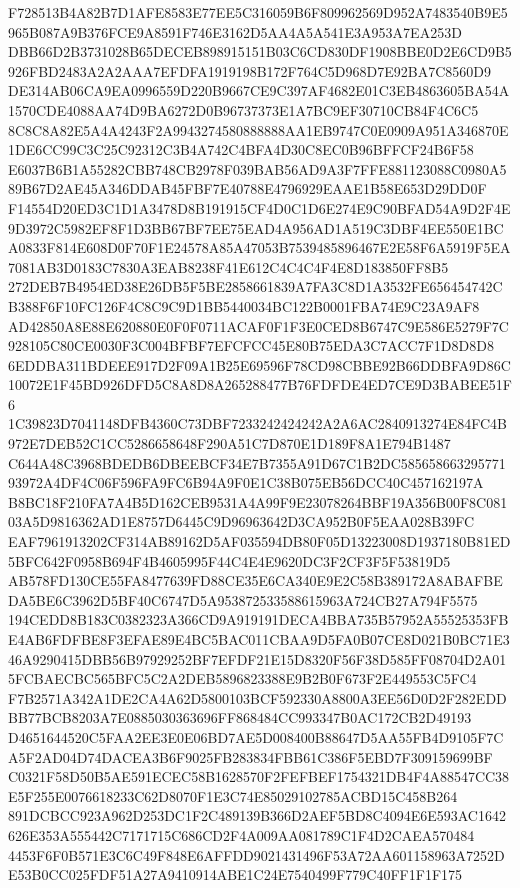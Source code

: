\documentclass[UTF8,fontset=fandol,zihao=-4,a4paper]{ctexart}
\begin{document}
{{F728513B4A82B7D1AFE8583E77EE5C316059B6F809962569D952A7483540B9E5965B087A9B376FCE9A8591F746E3162D5AA4A5A541E3A953A7EA253D
DBB66D2B3731028B65DECEB898915151B03C6CD830DF1908BBE0D2E6CD9B5926FBD2483A2A2AAA7EFDFA1919198B172F764C5D968D7E92BA7C8560D9
DE314AB06CA9EA0996559D220B9667CE9C397AF4682E01C3EB4863605BA54A1570CDE4088AA74D9BA6272D0B96737373E1A7BC9EF30710CB84F4C6C5
8C8C8A82E5A4A4243F2A9943274580888888AA1EB9747C0E0909A951A346870E1DE6CC99C3C25C92312C3B4A742C4BFA4D30C8EC0B96BFFCF24B6F58
E6037B6B1A55282CBB748CB2978F039BAB56AD9A3F7FFE881123088C0980A589B67D2AE45A346DDAB45FBF7E40788E4796929EAAE1B58E653D29DD0F
F14554D20ED3C1D1A3478D8B191915CF4D0C1D6E274E9C90BFAD54A9D2F4E9D3972C5982EF8F1D3BB67BF7EE75EAD4A956AD1A519C3DBF4EE550E1BC
A0833F814E608D0F70F1E24578A85A47053B7539485896467E2E58F6A5919F5EA7081AB3D0183C7830A3EAB8238F41E612C4C4C4F4E8D183850FF8B5
272DEB7B4954ED38E26DB5F5BE2858661839A7FA3C8D1A3532FE656454742CB388F6F10FC126F4C8C9C9D1BB5440034BC122B0001FBA74E9C23A9AF8
AD42850A8E88E620880E0F0F0711ACAF0F1F3E0CED8B6747C9E586E5279F7C928105C80CE0030F3C004BFBF7EFCFCC45E80B75EDA3C7ACC7F1D8D8D8
6EDDBA311BDEEE917D2F09A1B25E69596F78CD98CBBE92B66DDBFA9D86C10072E1F45BD926DFD5C8A8D8A265288477B76FDFDE4ED7CE9D3BABEE51F6
1C39823D7041148DFB4360C73DBF7233242424242A2A6AC2840913274E84FC4B972E7DEB52C1CC5286658648F290A51C7D870E1D189F8A1E794B1487
C644A48C3968BDEDB6DBEEBCF34E7B7355A91D67C1B2DC58565866329577193972A4DF4C06F596FA9FC6B94A9F0E1C38B075EB56DCC40C457162197A
B8BC18F210FA7A4B5D162CEB9531A4A99F9E23078264BBF19A356B00F8C08103A5D9816362AD1E8757D6445C9D96963642D3CA952B0F5EAA028B39FC
EAF7961913202CF314AB89162D5AF035594DB80F05D13223008D1937180B81ED5BFC642F0958B694F4B4605995F44C4E4E9620DC3F2CF3F5F53819D5
AB578FD130CE55FA8477639FD88CE35E6CA340E9E2C58B389172A8ABAFBEDA5BE6C3962D5BF40C6747D5A953872533588615963A724CB27A794F5575
194CEDD8B183C0382323A366CD9A919191DECA4BBA735B57952A55525353FBE4AB6FDFBE8F3EFAE89E4BC5BAC011CBAA9D5FA0B07CE8D021B0BC71E3
46A9290415DBB56B97929252BF7EFDF21E15D8320F56F38D585FF08704D2A015FCBAECBC565BFC5C2A2DEB5896823388E9B2B0F673F2E449553C5FC4
F7B2571A342A1DE2CA4A62D5800103BCF592330A8800A3EE56D0D2F282EDDBB77BCB8203A7E0885030363696FF868484CC993347B0AC172CB2D49193
D4651644520C5FAA2EE3E0E06BD7AE5D008400B88647D5AA55FB4D9105F7CA5F2AD04D74DACEA3B6F9025FB283834FBB61C386F5EBD7F309159699BF
C0321F58D50B5AE591ECEC58B1628570F2FEFBEF1754321DB4F4A88547CC38E5F255E0076618233C62D8070F1E3C74E85029102785ACBD15C458B264
891DCBCC923A962D253DC1F2C489139B366D2AEF5BD8C4094E6E593AC1642626E353A555442C7171715C686CD2F4A009AA081789C1F4D2CAEA570484
4453F6F0B571E3C6C49F848E6AFFDD9021431496F53A72AA601158963A7252DE53B0CC025FDF51A27A9410914ABE1C24E7540499F779C40FF1F1F175
}}
\end{document}
